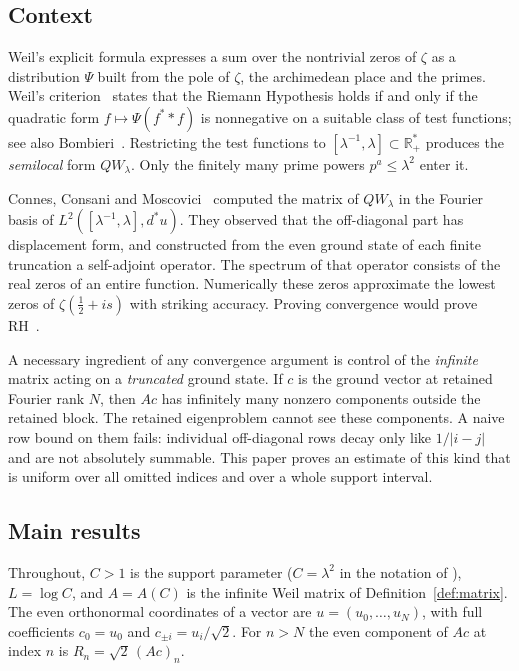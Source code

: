 \documentclass[11pt,a4paper]{article}
\theoremstyle{definition}
\newcommand{\R}{\mathbb{R}}
\newcommand{\abs}[1]{\lvert #1\rvert}
\begin{document}
\subsection{Context}
Weil's explicit formula expresses a sum over the nontrivial zeros of
$\zeta$ as a distribution $\Psi$ built from the pole of $\zeta$, the
archimedean place and the primes. Weil's criterion~\cite{Weil1952} states
that the Riemann Hypothesis holds if and only if the quadratic form
$f\mapsto \Psi(f^{*}*f)$ is nonnegative on a suitable class of test functions;
see also Bombieri~\cite{Bombieri2000}. Restricting the test functions to
$[\lambda^{-1},\lambda]\subset\R_+^{*}$ produces the \emph{semilocal} form
$QW_\lambda$. Only the finitely many prime powers $p^a\le\lambda^2$ enter it.

Connes, Consani and Moscovici~\cite{CCM2025} computed the matrix of
$QW_\lambda$ in the Fourier basis of $L^2([\lambda^{-1},\lambda],d^{*}u)$.
They observed that the off-diagonal part has displacement form, and
constructed from the even ground state of each finite truncation a
self-adjoint operator. The spectrum of that operator consists of the real
zeros of an entire function. Numerically these zeros approximate the
lowest zeros of $\zeta(\tfrac12+is)$ with striking accuracy. Proving
convergence would prove RH~\cite[\S7--8]{CCM2025}.

A necessary ingredient of any convergence argument is control of the
\emph{infinite} matrix acting on a \emph{truncated} ground state. If
$c$ is the ground vector at retained Fourier rank $N$, then $A c$ has
infinitely many nonzero components outside the retained block. The
retained eigenproblem cannot see these components. A naive row bound on
them fails: individual off-diagonal rows decay only like $1/\abs{i-j}$ and
are not absolutely summable. This paper proves an estimate of this kind
that is uniform over all omitted indices and over a whole support interval.

\subsection{Main results}
Throughout, $C>1$ is the support parameter ($C=\lambda^2$ in the notation of
\cite{CCM2025}), $L=\log C$, and $A=A(C)$ is the infinite Weil matrix of
Definition~\ref{def:matrix}. The even orthonormal coordinates of a vector are
$u=(u_0,\dots,u_N)$, with full coefficients $c_0=u_0$ and
$c_{\pm i}=u_i/\sqrt2$. For $n>N$ the even component of $Ac$ at index $n$ is
$R_n=\sqrt2\,(Ac)_n$.
\end{document}
